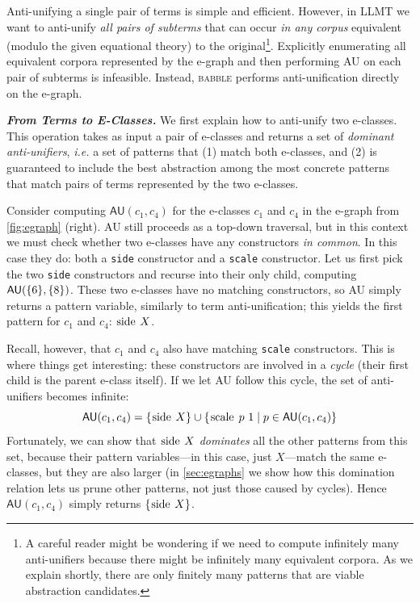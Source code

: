 \documentclass[acmsmall,screen,nonacm,review=false,timestamp=false]{acmart}
\newcommand{\ie}{\emph{i.e.}\xspace}
\newcommand{\emphbf}[1]{\emph{\textbf{#1}\xspace}}
\newcommand{\mypara}[1]{\smallskip\noindent\emphbf{#1.}\xspace}
\newcommand{\tname}[1]{\textsc{#1}\xspace}
\newcommand{\tool}{\tname{babble}}
\newcommand{\T}[1]{\mbox{\lstinline^#1^}}
\newcommand{\au}{\mathsf{AU}}
\begin{document}
Anti-unifying
  a single pair of terms is simple and efficient.
However,
  in LLMT we want to anti-unify \emph{all pairs of subterms}
  that can occur \emph{in any corpus} equivalent
  (modulo the given equational theory)
  to the original\footnote{
      A careful reader might be wondering if
        we need to compute infinitely many anti-unifiers
        because there might be infinitely many equivalent corpora.
      As we explain shortly,
        there are only finitely many patterns that
        are viable abstraction candidates.
    }.
Explicitly enumerating all equivalent corpora
  represented by the e-graph and then
  performing AU on each pair of subterms
  is infeasible.
Instead, \tool performs
  anti-unification directly on the e-graph.

\mypara{From Terms to E-Classes}
We first explain how to
  anti-unify two e-classes.
This operation takes as input a pair of e-classes and
  returns a set of \emph{dominant anti-unifiers},
  \ie a set of patterns that
    (1) match both e-classes, and
    (2) is guaranteed to include
      the best abstraction 
      among the most concrete patterns 
      that match pairs of terms represented by the two e-classes.



Consider computing $\au(c_1, c_4)$
  for the e-classes $c_1$ and $c_4$ in
  the e-graph from \autoref{fig:egraph} (right).
AU still proceeds as a top-down traversal,
  but in this context we must
  check whether two e-classes have
  any constructors \emph{in common}.
In this case they do:
  both a \T{side} constructor and a \T{scale} constructor.
Let us first pick the two \T{side} constructors
  and recurse into their only child,
  computing $\au(\{\T{6}\}, \{\T{8}\})$.
These two e-classes have
  no matching constructors,
  so AU simply returns a pattern variable,
  similarly to term anti-unification;
  this yields the first pattern for $c_1$ and $c_4$: $\T{side}\ X$.
  
Recall, however, that $c_1$ and $c_4$ also 
  have matching \T{scale} constructors.
This is where things get interesting:
  these constructors are involved in a \emph{cycle} 
  (their first child is the parent e-class itself).
If we let AU follow this cycle, the set of anti-unifiers becomes infinite:
  $$
    \au(c_1, c_4) = \{\T{side}\ X\} \cup \{\T{scale}\ p\ 1 \mid p \in \au(c_1, c_4)\}
  $$
Fortunately,
  we can show that $\T{side}\ X$ \emph{dominates}
  all the other patterns from this set,
  because their pattern variables---in this case, just $X$---match
  the same e-classes, but they are also larger
  (in \autoref{sec:egraphs} we show how
  this domination relation lets us prune other patterns,
  not just those caused by cycles).
Hence $\au(c_1, c_4)$ simply returns $\{\T{side}\ X\}$.
\end{document}
